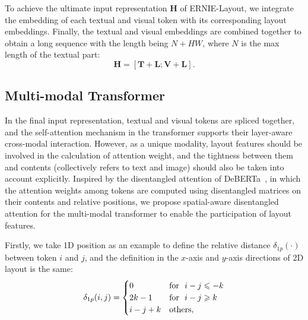 \documentclass[11pt]{article}
\begin{document}
To achieve the ultimate input representation $\textbf{H}$ of ERNIE-Layout,
we integrate the embedding of each textual and visual token with its corresponding layout embeddings.
Finally, the textual and visual embeddings are combined together to obtain a long sequence with the length being $N+HW$, where $N$ is the max length of the textual part:
%
\begin{equation}
\textbf{H} = [\textbf{T}+ \textbf{L};\textbf{V}+ \textbf{L}].
\end{equation}
%

\subsection{Multi-modal Transformer}
\label{sec:muti-modal-transformer}

In the final input representation, textual and visual tokens are spliced together, and the self-attention mechanism in the transformer supports their layer-aware cross-modal interaction.
However, as a unique modality, layout features should be involved in the calculation of attention weight, and the tightness between them and contents (collectively refers to text and image) should also be taken into account explicitly.
Inspired by the disentangled attention of DeBERTa~\cite{he2021deberta}, in which the attention weights among tokens are computed using disentangled matrices on their contents and relative positions, we propose spatial-aware disentangled attention for the multi-modal transformer to enable the participation of layout features.

Firstly, we take 1D position as an example to define the relative distance $\delta_{1p}(\cdot)$ between token $i$ and $j$, and the definition in the $x$-axis and $y$-axis directions of 2D layout is the same:
%
\begin{equation}
    \delta_{1p}(i, j) =\begin{cases}0 & {\rm for}\ \ i - j \leqslant -k\\2k-1 & {\rm for}\  \ i-j \geqslant k\\i-j+k & {\rm others,}\end{cases}
\end{equation}
\end{document}
